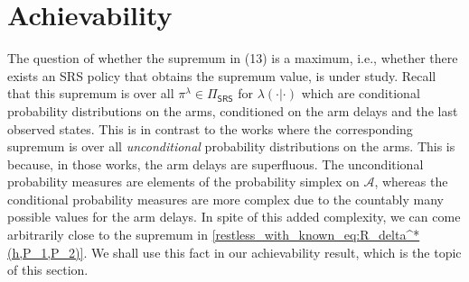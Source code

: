\section{Achievability}\label{restless_with_known_sec:achievability}
The question of whether the supremum in (13) is a maximum, i.e., whether there exists an SRS policy that obtains the supremum value, is under study.
Recall that this supremum is over all $\pi^\lambda\in \Pi_{\textsf{SRS}}$ for $\lambda(\cdot|\cdot)$ which are conditional probability distributions on the arms, conditioned on the arm delays and the last observed states. This is in contrast to the works \cite{Vaidhiyan2017, vaidhiyan2012active, vaidhiyan2017learning, prabhu2017optimal} where the corresponding supremum is over all \emph{unconditional} probability distributions on the arms. This is because, in those works, the arm delays are superfluous. The unconditional probability measures are elements of the probability simplex on $\mathcal{A}$, whereas the conditional probability measures are more complex due to the countably many possible values for the arm delays. In spite of this added complexity, we can come arbitrarily close to the supremum in \eqref{restless_with_known_eq:R_delta^*(h,P_1,P_2)}.
We shall use this fact in our achievability result, which is the topic of this section.

